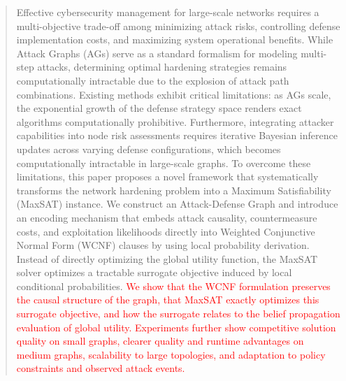 \documentclass[conference]{IEEEtran}
\theoremstyle{definition} %
\theoremstyle{plain} %
\begin{document}
\maketitle

\begin{abstract}
Effective cybersecurity management for large-scale networks requires a multi-objective trade-off among minimizing attack risks, controlling defense implementation costs, and maximizing system operational benefits. While Attack Graphs (AGs) serve as a standard formalism for modeling multi-step attacks, determining optimal hardening strategies remains computationally intractable due to the explosion of attack path combinations. Existing methods exhibit critical limitations: as AGs scale, the exponential growth of the defense strategy space renders exact algorithms computationally prohibitive. Furthermore, integrating attacker capabilities into node risk assessments requires iterative Bayesian inference updates across varying defense configurations, which becomes computationally intractable in large-scale graphs. To overcome these limitations, this paper proposes a novel framework that systematically transforms the network hardening problem into a Maximum Satisfiability (MaxSAT) instance. We construct an Attack-Defense Graph and introduce an encoding mechanism that embeds attack causality, countermeasure costs, and exploitation likelihoods directly into Weighted Conjunctive Normal Form (WCNF) clauses by using local probability derivation. Instead of directly optimizing the global utility function, the MaxSAT solver optimizes a tractable surrogate objective induced by local conditional probabilities. \textcolor{red}{We show that the WCNF formulation preserves the causal structure of the graph, that MaxSAT exactly optimizes this surrogate objective, and how the surrogate relates to the belief propagation evaluation of global utility. Experiments further show competitive solution quality on small graphs, clearer quality and runtime advantages on medium graphs, scalability to large topologies, and adaptation to policy constraints and observed attack events.}
\end{abstract}






%
\IEEEpeerreviewmaketitle
\end{document}
